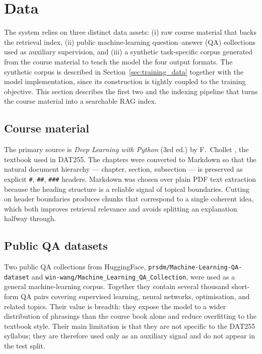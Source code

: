 \section{Data}
\label{sec:data}

The system relies on three distinct data assets: (i) raw course material that backs the
retrieval index, (ii) public machine-learning question--answer (QA) collections used as
auxiliary supervision, and (iii) a synthetic task-specific corpus generated from the course
material to teach the model the four output formats. The synthetic corpus is described in
Section~\ref{sec:training_data} together with the model implementation, since its construction
is tightly coupled to the training objective. This section describes the first two and the
indexing pipeline that turns the course material into a searchable RAG index.

\subsection{Course material}

The primary source is \textit{Deep Learning with Python} (3rd ed.) by F.\ Chollet
\cite{chollet2024dlwithpython}, the textbook used in DAT255. The chapters were converted to
Markdown so that the natural document hierarchy --- chapter, section, subsection --- is
preserved as explicit \texttt{\#}, \texttt{\#\#}, \texttt{\#\#\#} headers. Markdown was chosen
over plain PDF text extraction because the heading structure is a reliable signal of topical
boundaries. Cutting on header boundaries produces chunks that correspond to a single coherent
idea, which both improves retrieval relevance and avoids splitting an explanation halfway
through.

\subsection{Public QA datasets}

Two public QA collections from HuggingFace,
\texttt{prsdm/\allowbreak Machine-\allowbreak Learning-\allowbreak QA-\allowbreak dataset}
and
\texttt{win-wang/\allowbreak Machine\_\allowbreak Learning\_\allowbreak QA\_\allowbreak Collection},
were used as a general machine-learning corpus. Together they contain several thousand
short-form QA pairs covering supervised learning, neural networks, optimisation, and related
topics. Their value is breadth: they expose the model to a wider distribution of phrasings
than the course book alone and reduce overfitting to the textbook style. Their main
limitation is that they are not specific to the DAT255 syllabus; they are therefore used
only as an auxiliary signal and do not appear in the test split.

